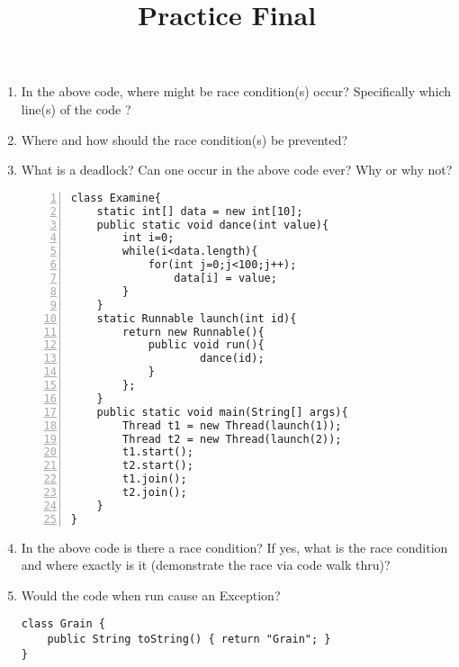 \documentclass{article}
\author{}
\date{}
\title{Practice Final}
\begin{document}
\maketitle
\begin{enumerate}
\begin{lstlisting}[numbers=left]
class Race{
	public static final int MAX = 5;
 	public static final int MIN = 1;

 	private static int data=Race.MIN;
	public static int getData(){
		return data;
	}
	public static void incData() {
		if (data < Race.MAX)
			data++;
	}
	public static void foo() throws Exception{
		while (data < Race.MAX)
			incData();
	}
}

public class Car implements Runnable { 
	public void run(){
		Race.foo();
	}
	public static void main(String[] args) throws Exception{
  		Thread t1 = new Thread(new Car());
  		Thread t2 = new Thread(new Car());
  		t1.start();
  		t2.start();
  		t1.join();
  		t2.join();
  		System.out.println(Race.getData());
 	}
}
\end{lstlisting}
	\item In the above code, where might be race condition(s) occur? Specifically which line(s) of the code ?
	\item Where and how should the race condition(s) be prevented?
	\item What is a deadlock? Can one occur in the above code ever? Why or why not?
\newpage
\begin{lstlisting}[numbers=left]
class Examine{
 	static int[] data = new int[10];
 	public static void dance(int value){
  		int i=0;
  		while(i<data.length){
   			for(int j=0;j<100;j++);
   				data[i] = value;
  		}
 	}
 	static Runnable launch(int id){
  		return new Runnable(){
   			public void run(){
    				dance(id);
   			}
 		};
 	}
 	public static void main(String[] args){
  		Thread t1 = new Thread(launch(1));
  		Thread t2 = new Thread(launch(2));
  		t1.start();
  		t2.start();
  		t1.join();
  		t2.join();
 	}
}
\end{lstlisting}
	\item In the above code is there a race condition? If yes, what is the race condition and where exactly is it (demonstrate the race via code walk thru)?\newline
	\item Would the code when run cause an Exception?
\newpage
\begin{lstlisting}
class Grain {
  	public String toString() { return "Grain"; }
}


\end{lstlisting}
\end{enumerate}
\end{document}
